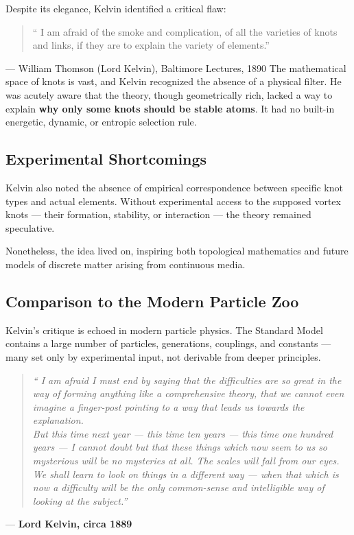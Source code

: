    Despite its elegance, Kelvin identified a critical flaw:

   \begin{quote}
   `` I am afraid of the smoke and complication, of all the varieties of knots and links, if they are to explain the variety of elements.''
   \end{quote}
    \hfill — William Thomson (Lord Kelvin), Baltimore Lectures, 1890
   The mathematical space of knots is vast, and Kelvin recognized the absence of a physical filter. He was acutely aware that the theory, though geometrically rich, lacked a way to explain \textbf{why only some knots should be stable atoms}. It had no built-in energetic, dynamic, or entropic selection rule.

   \subsection*{Experimental Shortcomings}

   Kelvin also noted the absence of empirical correspondence between specific knot types and actual elements. Without experimental access to the supposed vortex knots — their formation, stability, or interaction — the theory remained speculative.

   Nonetheless, the idea lived on, inspiring both topological mathematics and future models of discrete matter arising from continuous media.

   \subsection*{Comparison to the Modern Particle Zoo}

   Kelvin's critique is echoed in modern particle physics. The Standard Model contains a large number of particles, generations, couplings, and constants — many set only by experimental input, not derivable from deeper principles.

   \begin{quote}
   \textit{`` I am afraid I must end by saying that the difficulties are so great in the way of forming anything like a comprehensive theory, that we cannot even imagine a finger-post pointing to a way that leads us towards the explanation.} \\
   \textit{But this time next year — this time ten years — this time one hundred years — I cannot doubt but that these things which now seem to us so mysterious will be no mysteries at all. The scales will fall from our eyes. We shall learn to look on things in a different way — when that which is now a difficulty will be the only common-sense and intelligible way of looking at the subject.''}
   \end{quote}
   \begin{flushright}
      — \textbf{Lord Kelvin, circa 1889}
   \end{flushright}


